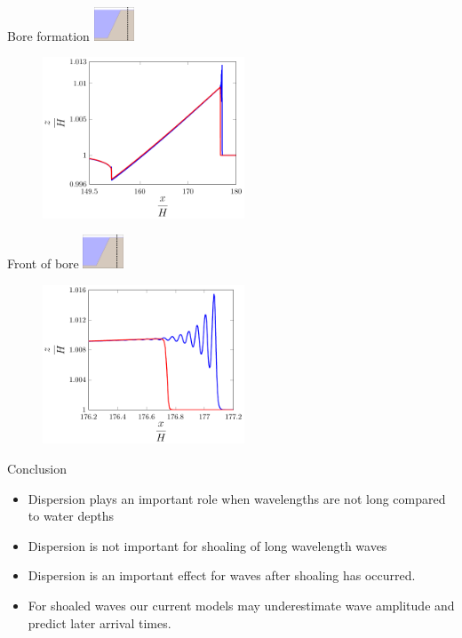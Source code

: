 \documentclass[pdf]{beamer}
\begin{document}
\begin{frame}{Bore formation \space\space \includegraphics[width=1.2cm]{./Pics/Diagram/1n2-figure0.pdf} }
	\begin{figure}
		\includegraphics[width=6cm]{./Pics/100s.pdf}
	\end{figure}
\end{frame}

\begin{frame}{Front of bore \includegraphics[width=1.2cm]{./Pics/Diagram/1n2-figure0.pdf}}
	\begin{figure}
		\includegraphics[width=6cm]{./Pics/SerreBore.pdf}
	\end{figure}
\end{frame}

\begin{frame}{Conclusion}
\begin{itemize}
	\item Dispersion plays an important role when wavelengths are not long compared to water depths
	\item Dispersion is not important for shoaling of long wavelength waves
	\item Dispersion is an important effect for waves after shoaling has occurred. 
	\item For shoaled waves our current models may underestimate wave amplitude and predict later arrival times.
\end{itemize}
\end{frame}
\end{document}
